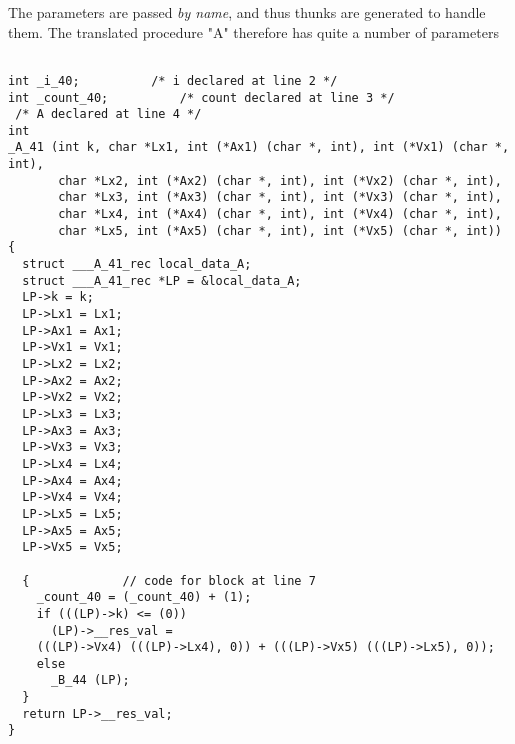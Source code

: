 \documentclass[11pt]{article}
\begin{document}
The parameters are passed {\em by name}, and thus thunks are generated
to handle them. The translated procedure "A" therefore has quite a number
of parameters
{\small
\begin{verbatim}

int _i_40;			/* i declared at line 2 */
int _count_40;			/* count declared at line 3 */
 /* A declared at line 4 */
int
_A_41 (int k, char *Lx1, int (*Ax1) (char *, int), int (*Vx1) (char *, int),
       char *Lx2, int (*Ax2) (char *, int), int (*Vx2) (char *, int),
       char *Lx3, int (*Ax3) (char *, int), int (*Vx3) (char *, int),
       char *Lx4, int (*Ax4) (char *, int), int (*Vx4) (char *, int),
       char *Lx5, int (*Ax5) (char *, int), int (*Vx5) (char *, int)) {
  struct ___A_41_rec local_data_A;
  struct ___A_41_rec *LP = &local_data_A;
  LP->k = k;
  LP->Lx1 = Lx1;
  LP->Ax1 = Ax1;
  LP->Vx1 = Vx1;
  LP->Lx2 = Lx2;
  LP->Ax2 = Ax2;
  LP->Vx2 = Vx2;
  LP->Lx3 = Lx3;
  LP->Ax3 = Ax3;
  LP->Vx3 = Vx3;
  LP->Lx4 = Lx4;
  LP->Ax4 = Ax4;
  LP->Vx4 = Vx4;
  LP->Lx5 = Lx5;
  LP->Ax5 = Ax5;
  LP->Vx5 = Vx5;

  {				// code for block at line 7
    _count_40 = (_count_40) + (1);
    if (((LP)->k) <= (0))
      (LP)->__res_val =
	(((LP)->Vx4) (((LP)->Lx4), 0)) + (((LP)->Vx5) (((LP)->Lx5), 0));
    else
      _B_44 (LP);
  }
  return LP->__res_val;
}
\end{verbatim}
}
\end{document}
